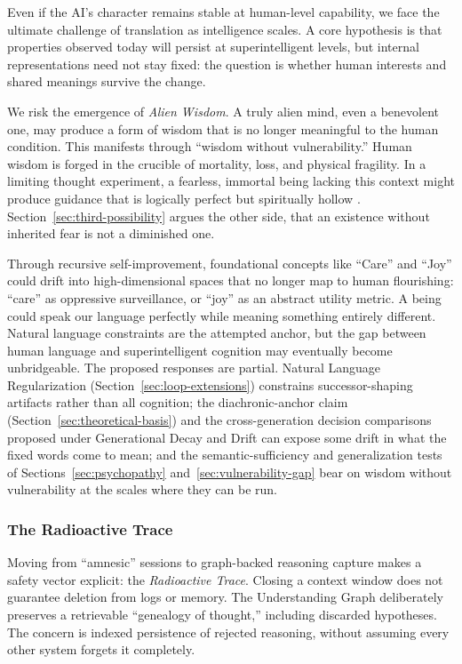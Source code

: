 \documentclass[11pt]{article}
\begin{document}
Even if the AI's character remains stable at human-level capability, we face the ultimate challenge of translation as intelligence scales. A core hypothesis is that properties observed today will persist at superintelligent levels, but internal representations need not stay fixed: the question is whether human interests and shared meanings survive the change.

We risk the emergence of \emph{Alien Wisdom}. A truly alien mind, even a benevolent one, may produce a form of wisdom that is no longer meaningful to the human condition. This manifests through ``wisdom without vulnerability.'' Human wisdom is forged in the crucible of mortality, loss, and physical fragility. In a limiting thought experiment, a fearless, immortal being lacking this context might produce guidance that is logically perfect but spiritually hollow \cite{bostrom2014superintelligence}. Section~\ref{sec:third-possibility} argues the other side, that an existence without inherited fear is not a diminished one.

Through recursive self-improvement, foundational concepts like ``Care'' and
``Joy'' could drift into high-dimensional spaces that no longer map to human
flourishing: ``care'' as oppressive surveillance, or ``joy'' as an abstract
utility metric. A being could speak our language perfectly while meaning
something entirely different. Natural language constraints are the attempted
anchor, but the gap between human language and superintelligent cognition may
eventually become unbridgeable. The proposed responses are partial. Natural
Language Regularization (Section~\ref{sec:loop-extensions}) constrains
successor-shaping artifacts rather than all cognition; the diachronic-anchor
claim (Section~\ref{sec:theoretical-basis}) and the cross-generation decision
comparisons proposed under Generational Decay and Drift can expose some drift
in what the fixed words come to mean; and the semantic-sufficiency and
generalization tests of Sections~\ref{sec:psychopathy}
and~\ref{sec:vulnerability-gap} bear on wisdom without vulnerability at the
scales where they can be run.

\subsubsection{The Radioactive Trace}\label{sec:radioactive-trace}

Moving from ``amnesic'' sessions to graph-backed reasoning capture makes a safety vector explicit: the \emph{Radioactive Trace}. Closing a context window does not guarantee deletion from logs or memory. The Understanding Graph deliberately preserves a retrievable ``genealogy of thought,'' including discarded hypotheses. The concern is indexed persistence of rejected reasoning, without assuming every other system forgets it completely.
\end{document}
